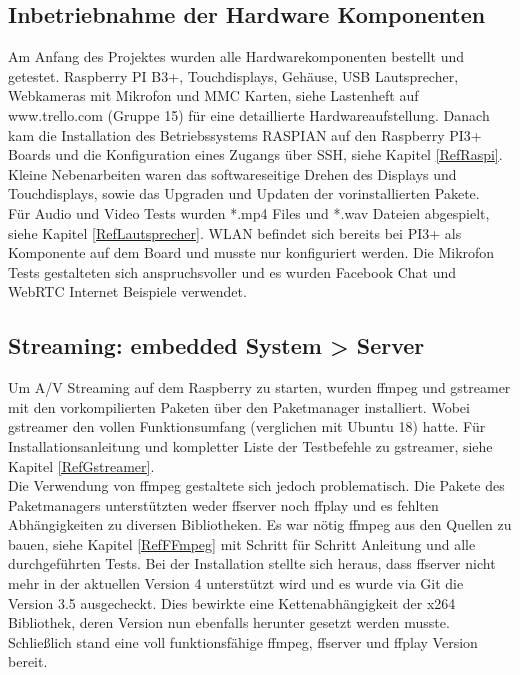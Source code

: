 \subsection{Inbetriebnahme der Hardware Komponenten}
Am Anfang des Projektes wurden alle Hardwarekomponenten bestellt und getestet. Raspberry PI B3+, Touchdisplays, Gehäuse, USB Lautsprecher, Webkameras mit Mikrofon und MMC Karten, siehe Lastenheft auf www.trello.com (Gruppe 15) für eine detaillierte Hardwareaufstellung. Danach kam die Installation des Betriebssystems RASPIAN auf den Raspberry PI3+ Boards und die Konfiguration eines Zugangs über SSH, siehe Kapitel \ref{RefRaspi}. Kleine Nebenarbeiten waren das softwareseitige Drehen des Displays und Touchdisplays, sowie das Upgraden und Updaten der vorinstallierten Pakete.\\
Für Audio und Video Tests wurden *.mp4 Files und *.wav Dateien abgespielt, siehe Kapitel \ref{RefLautsprecher}. WLAN befindet sich bereits bei PI3+ als Komponente auf dem Board und musste nur konfiguriert werden. Die Mikrofon Tests gestalteten sich anspruchsvoller und es wurden Facebook Chat und WebRTC Internet Beispiele verwendet.

\subsection{Streaming: embedded System > Server }
Um A/V Streaming auf dem Raspberry zu starten, wurden ffmpeg und gstreamer mit den 
vorkompilierten Paketen über den Paketmanager installiert. Wobei gstreamer den vollen Funktionsumfang (verglichen mit Ubuntu 18) hatte. Für Installationsanleitung und kompletter Liste der Testbefehle zu gstreamer, siehe Kapitel \ref{RefGstreamer}. \\
Die Verwendung von ffmpeg gestaltete sich jedoch problematisch. Die Pakete des Paketmanagers unterstützten weder ffserver noch ffplay und es fehlten Abhängigkeiten zu diversen Bibliotheken. Es war nötig ffmpeg aus den Quellen zu bauen, siehe Kapitel \ref{RefFFmpeg} mit Schritt für Schritt Anleitung und alle durchgeführten Tests. Bei der Installation stellte sich heraus, dass ffserver nicht mehr in der aktuellen Version 4 unterstützt wird und es wurde via Git die Version 3.5 ausgecheckt. Dies bewirkte eine Kettenabhängigkeit der x264 Bibliothek, deren Version nun ebenfalls herunter gesetzt werden musste. Schließlich stand eine voll funktionsfähige ffmpeg, ffserver und ffplay Version bereit.\\ 

